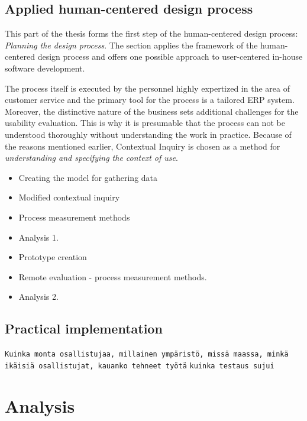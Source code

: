 \documentclass[12pt,a4paper,oneside,pdftex]{report}
\begin{document}
\section{Applied human-centered design process}
\label{sec:dprocess}

This part of the thesis forms the first step of the human-centered design process: \emph{Planning the design process}. The section applies the framework of the human-centered design process and offers one possible approach to user-centered in-house software development.

The process itself is executed by the personnel highly expertized in the area of customer service and the primary tool for the process is a tailored ERP system. Moreover, the distinctive nature of the business sets additional challenges for the usability evaluation. This is why it is presumable that the process can not be understood thoroughly without understanding the work in practice. Because of the reasons mentioned earlier, Contextual Inquiry is chosen as a method for \emph{understanding and specifying the context of use}.  



        \begin{itemize}
            \item Creating the model for gathering data
            \item Modified contextual inquiry 
            \item Process measurement methods
            \item Analysis 1.
            \item Prototype creation
            \item Remote evaluation - process measurement methods.
            \item Analysis 2.
        \end{itemize}

    \section{Practical implementation}
    \label{sec:implementation}
	\texttt{Kuinka monta osallistujaa, millainen ympäristö, missä maassa, minkä ikäisiä osallistujat, kauanko tehneet työtä}
    	\texttt{kuinka testaus sujui}
    	
\chapter{Analysis}
\label{chapter:analysis}
\end{document}

